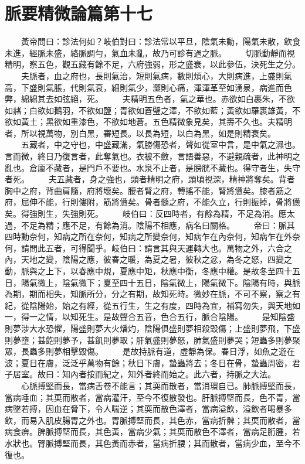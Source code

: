 \section{脈要精微論篇第十七}

　　黃帝問曰：診法何如？岐伯對曰：診法常以平旦，陰氣未動，陽氣未散，飲食未進，經脈未盛，絡脈調勻，氣血未亂，故乃可診有過之脈。
　　切脈動靜而視精明，察五色，觀五藏有餘不足，六府強弱，形之盛衰，以此參伍，決死生之分。
　　夫脈者，血之府也，長則氣治，短則氣病，數則煩心，大則病進，上盛則氣高，下盛則氣脹，代則氣衰，細則氣少，澀則心痛，渾渾革至如湧泉，病進而色弊，綿綿其去如弦絕，死。
　　夫精明五色者，氣之華也。赤欲如白裹朱，不欲如赭；白欲如鵝羽，不欲如鹽；青欲如蒼璧之澤，不欲如藍；黃欲如羅裹雄黃，不欲如黃土；黑欲如重漆色，不欲如地蒼。五色精微象見矣，其壽不久也。夫精明者，所以視萬物，別白黑，審短長。以長為短，以白為黑，如是則精衰矣。
　　五藏者，中之守也，中盛藏滿，氣勝傷恐者，聲如從室中言，是中氣之濕也。言而微，終日乃復言者，此奪氣也。衣被不斂，言語善惡，不避親疏者，此神明之亂也。倉廩不藏者，是門戶不要也。水泉不止者，是膀胱不藏也。得守者生，失守者死。
　　夫五藏者，身之強也，頭者精明之府，頭頃視深，精神將奪矣。背者胸中之府，背曲肩隨，府將壞矣。腰者腎之府，轉搖不能，腎將憊矣。膝者筋之府，屈伸不能，行則僂附，筋將憊矣。骨者髓之府，不能久立，行則振掉，骨將憊矣。得強則生，失強則死。
　　岐伯曰：反四時者，有餘為精，不足為消。應太過，不足為精；應不足，有餘為消。陰陽不相應，病名曰關格。
　　帝曰：脈其四時動奈何，知病之所在奈何，知病之所變奈何，知病乍在內奈何，知病乍在外奈何，請問此五者，可得聞乎。岐伯曰：請言其與天運轉大也。萬物之外，六合之內，天地之變，陰陽之應，彼春之暖，為夏之暑，彼秋之忿，為冬之怒，四變之動，脈與之上下，以春應中規，夏應中矩，秋應中衡，冬應中權。是故冬至四十五日，陽氣微上，陰氣微下；夏至四十五日，陰氣微上，陽氣微下。陰陽有時，與脈為期，期而相失，知脈所分，分之有期，故知死時。微妙在脈，不可不察，察之有紀，從陰陽始，始之有經，從五行生，生之有度，四時為宜，補寫勿失，與天地如一，得一之情，以知死生。是故聲合五音，色合五行，脈合陰陽。
　　是知陰盛則夢涉大水恐懼，陽盛則夢大火燔灼，陰陽俱盛則夢相殺毀傷；上盛則夢飛，下盛則夢墮；甚飽則夢予，甚飢則夢取；肝氣盛則夢怒，肺氣盛則夢哭；短蟲多則夢聚眾，長蟲多則夢相擊毀傷。
　　是故持脈有道，虛靜為保。春日浮，如魚之遊在波；夏日在膚，泛泛乎萬物有餘；秋日下膚，蟄蟲將去；冬日在骨，蟄蟲周密，君子居室。故曰：知內者按而紀之，知外者終而始之。此六者，持脈之大法。
　　心脈搏堅而長，當病舌卷不能言；其耎而散者，當消環自已。肺脈搏堅而長，當病唾血；其耎而散者，當病灌汗，至今不復散發也。肝脈搏堅而長，色不青，當病墜若搏，因血在脅下，令人喘逆；其耎而散色澤者，當病溢飲，溢飲者喝暴多飲，而易入肌皮腸胃之外也。胃脈搏堅而長，其色赤，當病折髀；其耎而散者，當病食痹。脾脈搏堅而長，其色黃，當病少氣；其耎而散色不澤者，當病足胻腫，若水狀也。腎脈搏堅而長，其色黃而赤者，當病折腰；其而散者，當病少血，至今不復也。
